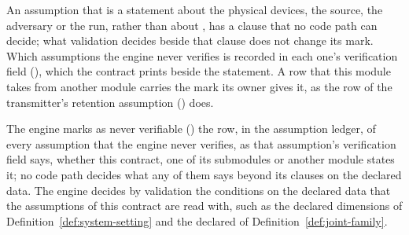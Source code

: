 
An assumption that is a statement about the physical devices, the source,
the adversary or the run, rather than about , has a
clause that no code path can decide; what validation decides beside that
clause does not change its mark. Which assumptions the engine never verifies
is recorded in each one's verification field
(),
which the contract prints beside the statement. A row that this module takes
from another module carries the mark its owner gives it, as the row of the
transmitter's retention assumption () does.

\begin{requirement}\label{req:never-verified-assumptions}
The engine marks as never verifiable () the row, in the
assumption ledger, of every assumption that the engine never verifies, as
that assumption's verification field says, whether this contract, one of its
submodules or another module states it; no code path decides what any of
them says beyond its clauses on the declared data. The engine decides by
validation the conditions on the declared data that the assumptions of this
contract are read with, such as the declared dimensions of
Definition~\ref{def:system-setting} and the declared  of
Definition~\ref{def:joint-family}.
\end{requirement}
